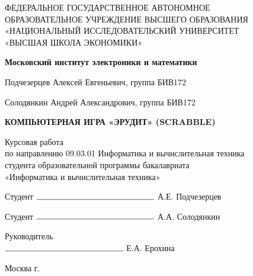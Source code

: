 \begin{titlepage}
	\begin{center}
		ФЕДЕРАЛЬНОЕ  ГОСУДАРСТВЕННОЕ АВТОНОМНОЕ \\
		ОБРАЗОВАТЕЛЬНОЕ УЧРЕЖДЕНИЕ ВЫСШЕГО ОБРАЗОВАНИЯ\\
		«НАЦИОНАЛЬНЫЙ ИССЛЕДОВАТЕЛЬСКИЙ УНИВЕРСИТЕТ\\
		«ВЫСШАЯ ШКОЛА ЭКОНОМИКИ»
	\end{center}
	
	\begin{center}
		\textbf{Московский институт электроники и математики}
	\end{center}
	\vspace{1ex}	
	\begin{center}
		Подчезерцев Алексей Евгеньевич, группа БИВ172
		
		Солодянкин Андрей Александрович, группа БИВ172
	\end{center}	
	\vspace{1ex}
	\begin{center}
		\textbf{КОМПЬЮТЕРНАЯ ИГРА «ЭРУДИТ» (SCRABBLE)}
	\end{center}	
	\vspace{2ex}
	\begin{center}
		Курсовая работа\\
		по направлению 09.03.01 Информатика и вычислительная техника\\
		студента образовательной программы бакалавриата\\
		«Информатика и вычислительная техника»
	\end{center}
	\vspace{2ex}
	\begin{flushright}
		Студент $\rule{5cm}{0.15mm}$ А.Е. Подчезерцев 
		
		\vspace{1ex}
		Студент $\rule{5cm}{0.15mm}$ А.А. Солодянкин 
	\end{flushright}
	\vspace{3ex}
	\begin{flushright}
		Руководитель\\
		$\rule{5cm}{0.15mm}$ Е.А. Ерохина
	\end{flushright}
	\vfill
	\begin{center}
		Москва \the\year г.
	\end{center}
\end{titlepage}